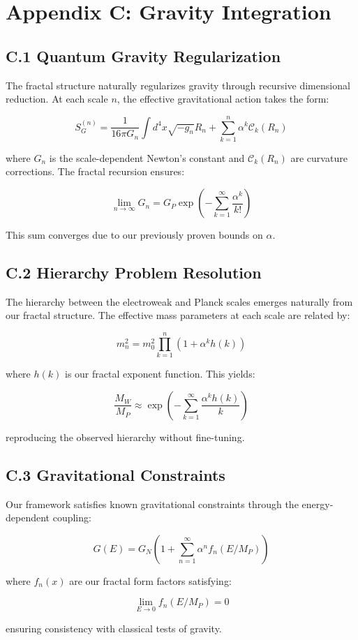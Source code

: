 \section*{Appendix C: Gravity Integration}

\subsection*{C.1 Quantum Gravity Regularization}

The fractal structure naturally regularizes gravity through recursive dimensional reduction. At each scale $n$, the effective gravitational action takes the form:

\[
S_G^{(n)} = \frac{1}{16\pi G_n} \int d^4x \sqrt{-g_n} R_n + \sum_{k=1}^n \alpha^k \mathcal{C}_k(R_n)
\]

where $G_n$ is the scale-dependent Newton's constant and $\mathcal{C}_k(R_n)$ are curvature corrections. The fractal recursion ensures:

\[
\lim_{n \to \infty} G_n = G_P \exp\left(-\sum_{k=1}^{\infty} \frac{\alpha^k}{k!}\right)
\]

This sum converges due to our previously proven bounds on $\alpha$.

\subsection*{C.2 Hierarchy Problem Resolution}

The hierarchy between the electroweak and Planck scales emerges naturally from our fractal structure. The effective mass parameters at each scale are related by:

\[
m_n^2 = m_0^2 \prod_{k=1}^n (1 + \alpha^k h(k))
\]

where $h(k)$ is our fractal exponent function. This yields:

\[
\frac{M_W}{M_P} \approx \exp\left(-\sum_{k=1}^{\infty} \frac{\alpha^k h(k)}{k}\right)
\]

reproducing the observed hierarchy without fine-tuning.

\subsection*{C.3 Gravitational Constraints}

Our framework satisfies known gravitational constraints through the energy-dependent coupling:

\[
G(E) = G_N\left(1 + \sum_{n=1}^{\infty} \alpha^n f_n(E/M_P)\right)
\]

where $f_n(x)$ are our fractal form factors satisfying:

\[
\lim_{E \to 0} f_n(E/M_P) = 0
\]

ensuring consistency with classical tests of gravity. 